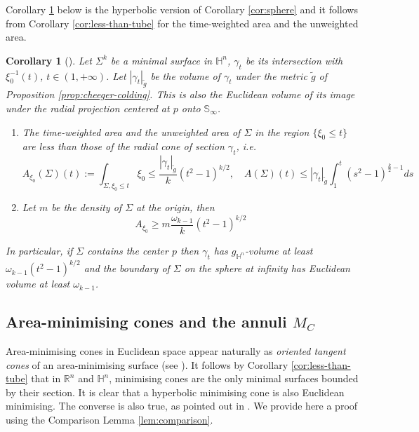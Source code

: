 \documentclass[11pt]{article}
\newtheorem{corollary}[theorem]{Corollary}
\begin{document}
Corollary \ref{cor:2pi} below is the hyperbolic version of Corollary \ref{cor:sphere} and it
follows from Corollary \ref{cor:less-than-tube} for the time-weighted area and the
unweighted area.

\begin{corollary}[]
\label{cor:2pi}
Let \(\Sigma^k\) be a minimal surface in \(\mathbb{H}^n\), \(\gamma_t\) be its
intersection with \(\xi_0^{-1}(t)\), \(t\in(1,+\infty)\). Let \(|\gamma_t|_{\tilde g}\) be the volume of \(\gamma_t\) under the metric \(\tilde g\) of Proposition \ref{prop:cheeger-colding}.
This is also the Euclidean volume of its image under the radial projection centered at \(p\)
onto \(\mathbb{S}_{\infty}\).
\begin{enumerate}
\item The time-weighted area and the unweighted area of \(\Sigma\) in the region \(\{\xi_0 \leq t\}\) are
less than those of the radial cone of section \(\gamma_t\), i.e.
\begin{equation}
\label{eq:cor:2pi-1}
A_{\xi_0}(\Sigma)(t):=\int_{\Sigma, \xi_0\leq t}\xi_0 \leq \frac{|\gamma_t|_{\tilde g}}{k}(t^2-1)^{k/2},\quad A(\Sigma)(t)\leq |\gamma_t|_{\tilde g} \int_{1}^t (s^2-1)^{\frac{k}{2}-1}ds
\end{equation}
\item Let \(m\) be the density of \(\Sigma\) at the origin, then
\begin{equation}
\label{eq:cor:2pi-2}
A_{\xi_0} \geq m\frac{\omega_{k-1}}{k}(t^2-1)^{k/2} 
\end{equation}
\end{enumerate}
In particular, if \(\Sigma\) contains the center \(p\) then \(\gamma_t\) has \(g_{\mathbb{H}^n}\)-volume at least \(\omega_{k-1}(t^2-1)^{k/2}\) 
and the boundary of \(\Sigma\) on the sphere at infinity has Euclidean volume at least \(\omega_{k-1}\).
\end{corollary}



\subsection{Area-minimising cones and the annuli \(M_C\)}
\label{sec:org706d46b}
Area-minimising cones in Euclidean space appear naturally as \emph{oriented tangent cones} of an
area-minimising surface (see \cite{Morgan16_GeometricMeasureTheory}). It follows by
Corollary \ref{cor:less-than-tube} that in \(\mathbb{R}^n\) and \(\mathbb{H}^n\),
minimising cones are the only minimal surfaces bounded by their section. 
It is clear that a hyperbolic minimising cone is
also Euclidean minimising. The converse is also true, as pointed out in
\cite{Anderson82_CompleteMinimalVarieties}. We provide here a proof using the Comparison
Lemma \ref{lem:comparison}.
\end{document}
